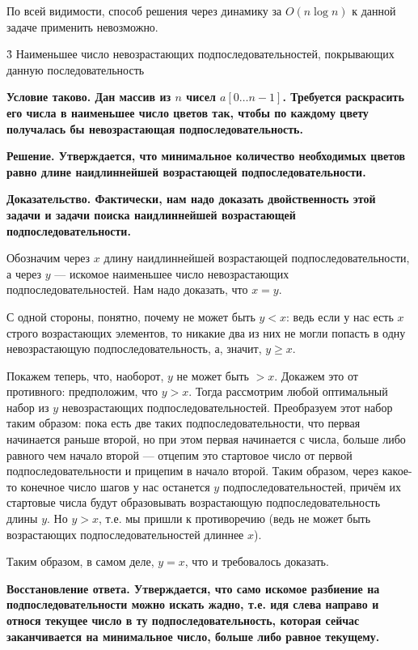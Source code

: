 По всей видимости, способ решения через динамику за $O (n \log n)$ к данной задаче применить невозможно.


\h3{ Наименьшее число невозрастающих подпоследовательностей, покрывающих данную последовательность }

\bf{Условие} таково. Дан массив из $n$ чисел $a[0 \ldots n-1]$. Требуется раскрасить его числа в наименьшее число цветов так, чтобы по каждому цвету получалась бы невозрастающая подпоследовательность.

\bf{Решение}. Утверждается, что минимальное количество необходимых цветов равно длине наидлиннейшей возрастающей подпоследовательности.

\bf{Доказательство}. Фактически, нам надо доказать \bf{двойственность} этой задачи и задачи поиска наидлиннейшей возрастающей подпоследовательности.

Обозначим через $x$ длину наидлиннейшей возрастающей подпоследовательности, а через $y$ --- искомое наименьшее число невозрастающих подпоследовательностей. Нам надо доказать, что $x=y$.

С одной стороны, понятно, почему не может быть $y<x$: ведь если у нас есть $x$ строго возрастающих элементов, то никакие два из них не могли попасть в одну невозрастающую подпоследовательность, а, значит, $y \ge x$.

Покажем теперь, что, наоборот, $y$ не может быть $> x$. Докажем это от противного: предположим, что $y > x$. Тогда рассмотрим любой оптимальный набор из $y$ невозрастающих подпоследовательностей. Преобразуем этот набор таким образом: пока есть две таких подпоследовательности, что первая начинается раньше второй, но при этом первая начинается с числа, больше либо равного чем начало второй --- отцепим это стартовое число от первой подпоследовательности и прицепим в начало второй. Таким образом, через какое-то конечное число шагов у нас останется $y$ подпоследовательностей, причём их стартовые числа будут образовывать возрастающую подпоследовательность длины $y$. Но $y > x$, т.е. мы пришли к противоречию (ведь не может быть возрастающих подпоследовательностей длиннее $x$).

Таким образом, в самом деле, $y = x$, что и требовалось доказать.

\bf{Восстановление ответа}. Утверждается, что само искомое разбиение на подпоследовательности можно искать жадно, т.е. идя слева направо и относя текущее число в ту подпоследовательность, которая сейчас заканчивается на минимальное число, больше либо равное текущему.



